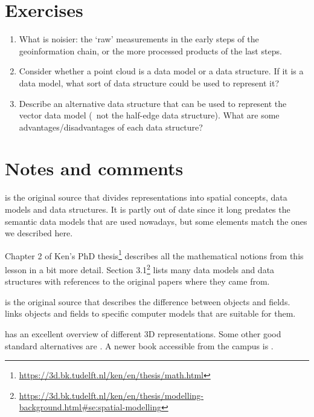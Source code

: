 %
\section{Exercises}

\begin{enumerate}
	\item What is noisier: the `raw' measurements in the early steps of the geoinformation chain, or the more processed products of the last steps.
	\item Consider whether a point cloud is a data model or a data structure. If it is a data model, what sort of data structure could be used to represent it?
  \item Describe an alternative data structure that can be used to represent the vector data model (\ie\ not the half-edge data structure). What are some advantages/disadvantages of each data structure?
\end{enumerate}



%
\section{Notes and comments}

\citet{Frank92} is the original source that divides representations into spatial concepts, data models and data structures.
It is partly out of date since it long predates the semantic data models that are used nowadays, but some elements match the ones we described here.

Chapter 2 of Ken's PhD thesis\footnote{\url{https://3d.bk.tudelft.nl/ken/en/thesis/math.html}} describes all the mathematical notions from this lesson in a bit more detail.
Section 3.1\footnote{\url{https://3d.bk.tudelft.nl/ken/en/thesis/modelling-background.html\#se:spatial-modelling}} lists many data models and data structures with references to the original papers where they came from.

\citet{Couclelis92} is the original source that describes the difference between objects and fields.
\citet{Goodchild92} links objects and fields to specific computer models that are suitable for them.

\citet{Mantyla88} has an excellent overview of different 3D representations.
Some other good standard alternatives are \citet{Requicha80,Hoffmann92,Foley95}.
A newer book accessible from the campus is \citet{Salomon11}.

